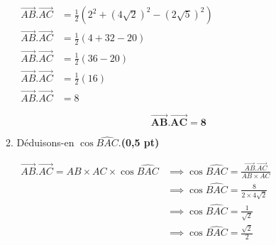 \documentclass[12pt,a4paper]{article}
\begin{document}
\begin{enumerate}
\begin{enumerate}
                    \(
                    \begin{aligned}
                        \overrightarrow{AB}.\overrightarrow{AC} & =\frac{1}{2}\left( 2^{2}+(4\sqrt{2})^{2}-(2\sqrt{5})^{2}\right) \\
                        \overrightarrow{AB}.\overrightarrow{AC} & =\frac{1}{2}\left( 4+32-20\right)                               \\
                        \overrightarrow{AB}.\overrightarrow{AC} & =\frac{1}{2}\left( 36-20\right)                                 \\
                        \overrightarrow{AB}.\overrightarrow{AC} & =\frac{1}{2}\left( 16\right)                                    \\
                        \overrightarrow{AB}.\overrightarrow{AC} & =8
                    \end{aligned}
                    \)

                    \begin{resultbox}
                        \[
                            \mathbf{\overrightarrow{AB}.\overrightarrow{AC}=8}
                        \]
                    \end{resultbox}

              \item Déduisons-en \( \cos \widehat{BAC} \).\hfill \textbf{(0,5 pt)}

                    \(
                    \begin{aligned}
                        \overrightarrow{AB}.\overrightarrow{AC}= AB\times AC \times \cos \widehat{BAC} & \implies \cos \widehat{BAC}=\frac{\overrightarrow{AB}.\overrightarrow{AC}}{AB\times AC} \\
                                                                                                       & \implies \cos \widehat{BAC}=\frac{8}{2\times 4\sqrt{2}}                                 \\
                                                                                                       & \implies \cos \widehat{BAC}=\frac{1}{\sqrt{2}}                                          \\
                                                                                                       & \implies \cos \widehat{BAC}=\frac{\sqrt{2}}{2}                                          \\
                    \end{aligned}
                    \)


\end{enumerate}
\end{enumerate}
\end{document}
